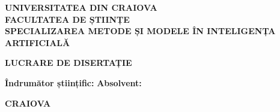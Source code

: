 \begin{titlepage}
    \centering
    \vspace*{1cm}
    
    {\Large \textbf{UNIVERSITATEA DIN CRAIOVA}\\[0.3cm]
    \textbf{FACULTATEA DE ȘTIINȚE}\\[0.3cm]
    \textbf{SPECIALIZAREA METODE ȘI MODELE ÎN INTELIGENȚA}\\[0.3cm]
    \textbf{ARTIFICIALĂ}\\[2cm]}
    
    {\LARGE \textbf{LUCRARE DE DISERTAȚIE}\\[3cm]}
    
    \begin{flushleft}
    \large
    \textbf{Îndrumător științific:} \hfill \textbf{Absolvent:}\\
    \textbf{\numeCoordonator} \hfill \textbf{\numeStudent}
    \end{flushleft}
    
    \vfill
    
    {\large \textbf{CRAIOVA\\\anLucrare}}
    
\end{titlepage}
